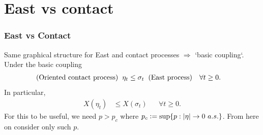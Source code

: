 \documentclass{beamer}
\newcommand{\defeq}{\vcentcolon=}
\begin{document}
\section{East vs contact}
\begin{frame}
\frametitle{East vs Contact}
\pause
Same graphical structure for East and contact processes $\Rightarrow$ `basic coupling`. \\
\pause
Under the basic coupling
\begin{align*}
(\text{Oriented contact process}) \hspace{2mm} \eta_{t} &\leq \sigma_{t} \hspace{2mm} (\text{East process}) &&\forall t \geq 0. 
\end{align*}
\pause
In particular, 
\begin{align*}
X(\eta_{t}) &\leq X(\sigma_{t}) &&\forall t \geq 0. 
\end{align*}
\pause
For this to be useful, we need $p > p_c$ where $p_c \defeq \sup\{ p : |\eta| \rightarrow 0\ a.s.\}$. From here on consider only such $p$. 
\end{frame}
\end{document}
